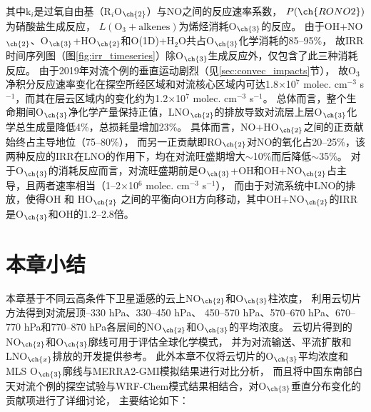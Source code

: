 其中k$_i$是过氧自由基（R$_i$O$_{\ch{2}}$）与NO之间的反应速率系数，
$P(\ch{RONO2})$为硝酸盐生成反应，
$L(\mathrm{O_3+alkenes})$为烯烃消耗O$_{\ch{3}}$的反应。
由于OH+NO$_{\ch{2}}$、O$_{\ch{3}}$+HO$_{\ch{2}}$和O(1D)+H$_2$O共占O$_{\ch{3}}$化学消耗的85--95\%，
故IRR时间序列图（图\ref{fig:irr_timeseries}）除O$_{\ch{3}}$生成反应外，仅包含了此三种消耗反应。
由于2019年对流个例的垂直运动剧烈（见\ref{sec:convec_impacts}节），
故O$_3$净积分反应速率变化在探空所经区域和对流核心区域内可达1.8$\times$10$^7$ molec. cm$^{-3}$ s$^{-1}$，而其在层云区域内的变化约为1.2$\times$10$^7$ molec. cm$^{-3}$ s$^{-1}$。
总体而言，整个生命期间O$_{\ch{3}}$净化学产量保持正值，LNO$_{\ch{2}}$的排放导致对流层上层O$_{\ch{3}}$化学总生成量降低4\%，总损耗量增加23\%。
具体而言，NO+HO$_{\ch{2}}$之间的正贡献始终占主导地位（75--80\%），
而另一正贡献即RO$_{\ch{2}}$对NO的氧化占20--25\%，该两种反应的IRR在LNO的作用下，均在对流旺盛期增大$\sim$10\%而后降低$\sim$35\%。
对于O$_{\ch{3}}$的消耗反应而言，对流旺盛期前是O$_{\ch{3}}$+OH和OH+NO$_{\ch{2}}$占主导，且两者速率相当（1--2$\times$10$^6$ molec. cm$^{-3}$ s$^{-1}$），
而由于对流系统中LNO的排放，使得OH 和 HO$_{\ch{2}}$ 之间的平衡向OH方向移动，其中OH+NO$_{\ch{2}}$的IRR是O$_{\ch{3}}$和OH的1.2--2.8倍。


\section{本章小结}

本章基于不同云高条件下卫星遥感的云上NO$_{\ch{2}}$和O$_{\ch{3}}$柱浓度，
利用云切片方法得到对流层顶--330 hPa、330--450 hPa、
450--570 hPa、570--670 hPa、670--770 hPa和770--870 hPa各层间的NO$_{\ch{2}}$和O$_{\ch{3}}$的平均浓度。
云切片得到的NO$_{\ch{2}}$和O$_{\ch{3}}$廓线可用于评估全球化学模式，
并为对流输送、平流扩散和LNO$_{\ch{x}}$排放的开发提供参考。
此外本章不仅将云切片的O$_{\ch{3}}$平均浓度和MLS O$_{\ch{3}}$廓线与MERRA2-GMI模拟结果进行对比分析，
而且将中国东南部白天对流个例的探空试验与WRF-Chem模式结果相结合，对O$_{\ch{3}}$垂直分布变化的贡献项进行了详细讨论，
主要结论如下：

